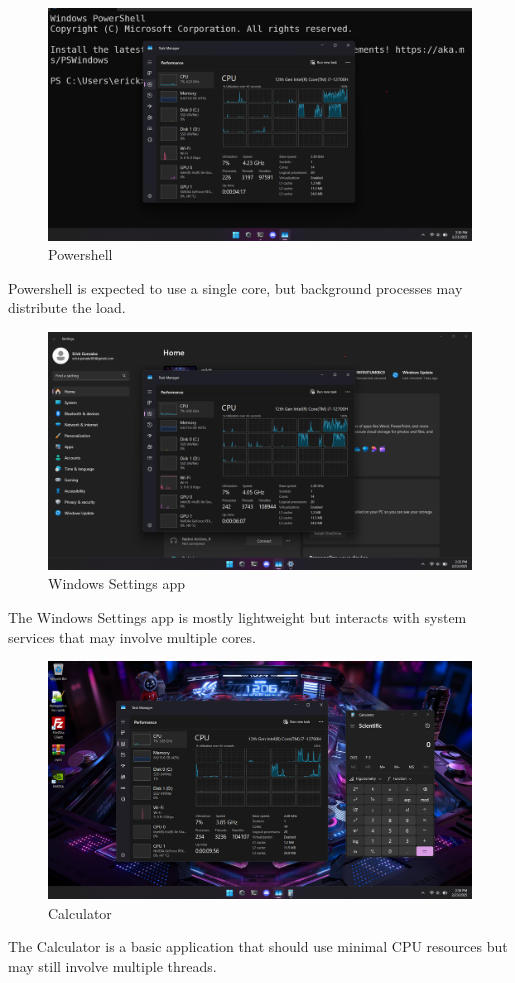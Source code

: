 \documentclass{article}
\begin{document}
\begin{figure}[H]
\centering
\includegraphics[width=1\textwidth]{imgs/mo1.png}
\caption{Powershell}
\label{fig:4}
\end{figure}
Powershell is expected to use a single core, but background processes may distribute the load.

\begin{figure}[H]
\centering
\includegraphics[width=1\textwidth]{imgs/mo2.png}
\caption{Windows Settings app}
\label{fig:5}
\end{figure}
The Windows Settings app is mostly lightweight but interacts with system services that may involve multiple cores.

\begin{figure}[H]
\centering
\includegraphics[width=1\textwidth]{imgs/mo3.png}
\caption{Calculator}
\label{fig:6}
\end{figure}
The Calculator is a basic application that should use minimal CPU resources but may still involve multiple threads.
\end{document}
